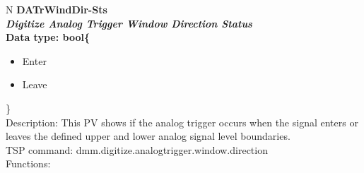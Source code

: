 \documentclass[openany]{article}
\begin{document}
		\begin{tabular}{N}
			\hline
			\bfseries DATrWindDir-Sts\label{pv:datrwinddir-sts} \\ \hline
			\emph{Digitize Analog Trigger Window Direction Status} \\
			Data type: bool\{\begin{itemize}[noitemsep]
				\small
				\item[] Enter
				\item[] Leave
			\end{itemize}\} \\
			Description: This PV shows if the analog trigger occurs when the signal enters or leaves the defined upper and lower analog signal level boundaries. \\
			TSP command: dmm.digitize.analogtrigger.window.direction \\
			Functions: \\
			\arrayrulecolor{\FuncTableBorderColor}

		\end{tabular}
\end{document}
